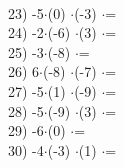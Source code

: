\documentclass[a4paper,10pt]{article}
\begin{document}
\vspace{0.5cm}\\23)   -5$\cdot$(0) $\cdot$(-3) $\cdot$=
\vspace{0.5cm}\\24)   -2$\cdot$(-6) $\cdot$(3) $\cdot$=
\vspace{0.5cm}\\25)   -3$\cdot$(-8) $\cdot$=
\vspace{0.5cm}\\26)   6$\cdot$(-8) $\cdot$(-7) $\cdot$=
\vspace{0.5cm}\\27)   -5$\cdot$(1) $\cdot$(-9) $\cdot$=
\vspace{0.5cm}\\28)   -5$\cdot$(-9) $\cdot$(3) $\cdot$=
\vspace{0.5cm}\\29)   -6$\cdot$(0) $\cdot$=
\vspace{0.5cm}\\30)   -4$\cdot$(-3) $\cdot$(1) $\cdot$=
\vspace{0.5cm}\\\pagebreak
\end{document}
